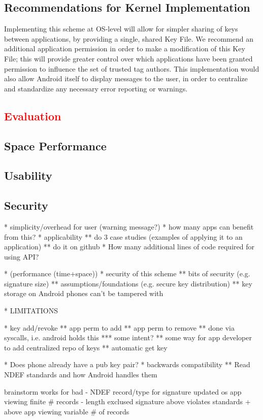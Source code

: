 \documentclass[12pt]{article}
\newcommand\TODO[1]{\textcolor{red}{#1}}
\begin{document}
\subsection{Recommendations for Kernel Implementation}
Implementing this scheme at OS-level will allow for simpler sharing of keys between applications, by providing a single, shared Key File.
We recommend an additional application permission in order to make a modification of this Key File; this will provide greater control over which applications have been granted permission to influence the set of trusted tag authors.
This implementation would also allow Android itself to display messages to the user, in order to centralize and standardize any necessary error reporting or warnings.

\TODO{\section{Evaluation}}
\subsection{Space Performance}
\subsection{Usability}
\subsection{Security}
* simplicity/overhead for user (warning message?)
* how many apps can benefit from this?
* applicability
** do 3 case studies (examples of applying it to an application)
** do it on github
* How many additional lines of code required for using API?

* (performance (time+space))
* security of this scheme
** bits of security (e.g. signature size)
** assumptions/foundations (e.g. secure key distribution)
** key storage on Android phones can't be tampered with

* LIMITATIONS

* key add/revoke
** app perm to add
** app perm to remove
** done via syscalls, i.e. android holds this
*** some intent?
** some way for app developer to add centralized repo of keys
** automatic get key

* Does phone already have a pub key pair?
* backwards compatibility
** Read NDEF standards and how Android handles them

brainstorm                         works for                           bad
- NDEF record/type for signature   updated os
                                   app viewing finite \# records
- length exclused signature        above                               violates standards
  + above                          app viewing variable \# of records   
\end{document}
